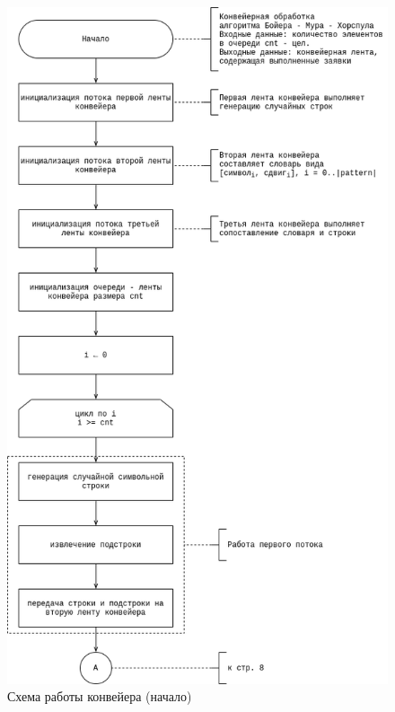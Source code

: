 \begin{center}
	\begin{figure}[H]
		\centering
		\includegraphics[width=0.8\linewidth]{assets/bmh_pipe-pipe-start.drawio.png}
		\caption{Схема работы конвейера (начало)}
		\label{fig:pipeline-1}
	\end{figure}
\end{center}

